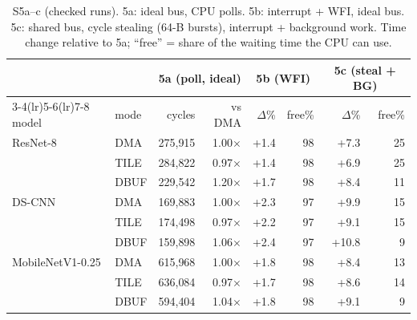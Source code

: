 \begin{table}[t]\centering\footnotesize\setlength{\tabcolsep}{2.6pt}
\caption{S5a--c (checked runs). 5a: ideal bus, CPU polls. 5b: interrupt + WFI, ideal bus. 5c: shared bus, cycle stealing (64-B bursts), interrupt + background work. Time change relative to 5a; ``free'' = share of the waiting time the CPU can use.}\label{tab:step5}
\begin{tabular}{@{}llrrrrrr@{}}\toprule
 & & \multicolumn{2}{c}{5a (poll, ideal)} & \multicolumn{2}{c}{5b (WFI)} & \multicolumn{2}{c}{5c (steal + BG)}\\
\cmidrule(lr){3-4}\cmidrule(lr){5-6}\cmidrule(lr){7-8}
model & mode & cycles & vs DMA & $\Delta$\% & free\% & $\Delta$\% & free\%\\\midrule
ResNet-8 & DMA & 275{,}915 & 1.00$\times$ & +1.4 & 98 & +7.3 & 25 \\
 & TILE & 284{,}822 & 0.97$\times$ & +1.4 & 98 & +6.9 & 25 \\
 & DBUF & 229{,}542 & 1.20$\times$ & +1.7 & 98 & +8.4 & 11 \\
\midrule
DS-CNN & DMA & 169{,}883 & 1.00$\times$ & +2.3 & 97 & +9.9 & 15 \\
 & TILE & 174{,}498 & 0.97$\times$ & +2.2 & 97 & +9.1 & 15 \\
 & DBUF & 159{,}898 & 1.06$\times$ & +2.4 & 97 & +10.8 & 9 \\
\midrule
MobileNetV1-0.25 & DMA & 615{,}968 & 1.00$\times$ & +1.8 & 98 & +8.4 & 13 \\
 & TILE & 636{,}084 & 0.97$\times$ & +1.7 & 98 & +8.6 & 14 \\
 & DBUF & 594{,}404 & 1.04$\times$ & +1.8 & 98 & +9.1 & 9 \\
\bottomrule\end{tabular}\end{table}
